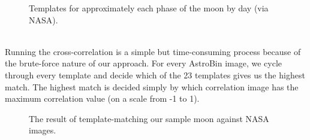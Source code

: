 \documentclass[]{article}
\begin{document}
\begin{figure}[h]
\caption{Templates for approximately each phase of the moon by day (via NASA).}
\end{figure}
\pagebreak
\\
Running the cross-correlation is a simple but time-consuming process because of the brute-force nature of our approach. For every AstroBin image, we cycle through every template and decide which of the 23 templates gives us the highest match. The highest match is decided simply by which correlation image has the maximum correlation value (on a scale from -1 to 1).
\begin{figure}[h]
\centering
{}
\caption{The result of template-matching our sample moon against NASA images.}
\end{figure}
\end{document}
